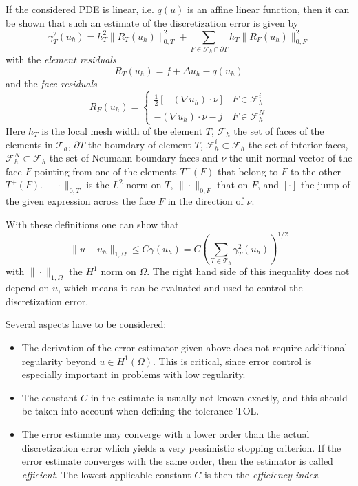 \documentclass[a4paper,12pt]{article}
\begin{document}
If the considered PDE is linear, i.e. $q(u)$ is an affine linear function, then it can be shown
\cite{Eriksson,AinsworthOden}
that such an estimate of the discretization error is given by
\begin{equation*}
  \gamma_T^2(u_h) = h_T^2 \| R_T(u_h) \|_{0,T}^2 + \sum_{F \in \mathcal{F}_h \cap \partial T} h_T \| R_F(u_h) \|_{0,F}^2
\end{equation*}
with the \emph{element residuals}
\begin{equation*}
  R_T(u_h) = f + \Delta u_h - q(u_h)
\end{equation*}
and the \emph{face residuals}
\begin{equation*}
  R_F(u_h) = \begin{cases} \frac{1}{2} [-(\nabla u_h) \cdot \nu] & F \in \mathcal{F}_h^i \\ - (\nabla u_h) \cdot \nu - j & F \in \mathcal{F}_h^N \end{cases}
\end{equation*}
Here $h_T$ is the local mesh width of the element $T$, $\mathcal{F}_h$ the set of faces of the elements
in $\mathcal{T}_h$, $\partial T$ the boundary of element $T$, $\mathcal{F}_h^i \subset \mathcal{F}_h$
the set of interior faces, $\mathcal{F}_h^N \subset \mathcal{F}_h$ the set of Neumann boundary faces and
$\nu$ the unit normal vector of the face $F$ pointing from one of the elements $T^-(F)$ that belong to
$F$ to the other $T^+(F)$. $\|\cdot\|_{0,T}$ is the $L^2$ norm on $T$, $\|\cdot\|_{0,F}$ that on $F$,
and $[\cdot]$ the jump of the given expression across the face $F$ in the direction of $\nu$.

With these definitions one can show that
\begin{equation*}
  \|u - u_h\|_{1,\Omega} \leq C \gamma(u_h) = C \left( \sum_{T \in {\mathcal T}_h} \gamma_T^2(u_h) \right)^{1/2}
\end{equation*}
with $\|\cdot\|_{1,\Omega}$ the $H^1$ norm on $\Omega$. The right hand side of this inequality does not
depend on $u$, which means it can be evaluated and used to control the discretization error.

Several aspects have to be considered:
\begin{itemize}
  \item The derivation of the error estimator given above does not require additional regularity
    beyond $u \in H^1(\Omega)$. This is critical, since error control is especially important
    in problems with low regularity.
  \item The constant $C$ in the estimate is usually not known exactly, and this should be taken
    into account when defining the tolerance $\text{TOL}$.
  \item The error estimate may converge with a lower order than the actual discretization error
    which yields a very pessimistic stopping criterion. If the error estimate converges with the
    same order, then the estimator is called \emph{efficient}. The lowest applicable constant $C$
    is then the \emph{efficiency index}.
\end{itemize}
\end{document}
